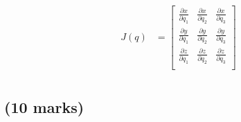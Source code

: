\begin{align*}
    J(q) &=
        \begin{bmatrix}
            \frac{\partial x}{\partial q_1} & \frac{\partial x}{\partial q_2} & \frac{\partial x}{\partial q_3} \\[0.5em]
            \frac{\partial y}{\partial q_1} & \frac{\partial y}{\partial q_2} & \frac{\partial y}{\partial q_3} \\[0.5em]
            \frac{\partial z}{\partial q_1} & \frac{\partial z}{\partial q_2} & \frac{\partial z}{\partial q_3} \\[0.5em]
        \end{bmatrix}\\
\end{align*}


\subsection{(10 marks)}

\newpage
